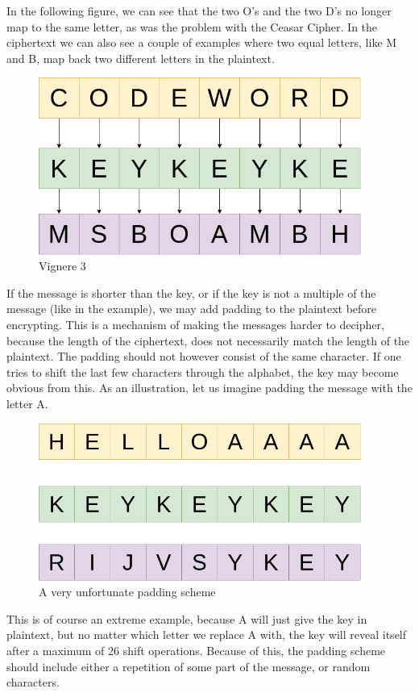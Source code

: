 \documentclass{article}
\begin{document}
In the following figure, we can see that the two O's and the two D's no longer map to the same letter, as was the problem with the Ceasar Cipher. In the ciphertext we can also see a couple of examples where two equal letters, like M and B, map back two different letters in the plaintext. 

\begin{figure}[H]
 \centering
  \includegraphics[width=300pt]{img/vigneredraw3.png}
 \caption{Vignere 3}
 \end{figure}



If the message is shorter than the key, or if the key is not a multiple of the message (like in the example), we may add padding to the plaintext before encrypting. This is a mechanism of making the messages harder to decipher, because the length of the ciphertext, does not necessarily match the length of the plaintext. The padding should not however consist of the same character. If one tries to shift the last few characters through the alphabet, the key may become obvious from this. As an illustration, let us imagine padding the message with the letter A. 

\begin{figure}[H]
 \centering
  \includegraphics[width=300pt]{img/vigneredraw4.png}
 \caption{A very unfortunate padding scheme}
 \end{figure}

This is of course an extreme example, because A will just give the key in plaintext, but no matter which letter we replace A with, the key will reveal itself after a maximum of 26 shift operations. Because of this, the padding scheme should include either a repetition of some part of the message, or random characters. 
\end{document}
